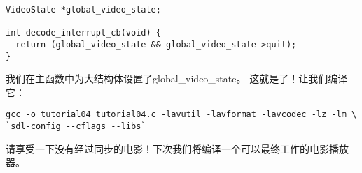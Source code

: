 \begin{lstlisting}
VideoState *global_video_state;

int decode_interrupt_cb(void) {
  return (global_video_state && global_video_state->quit);
}
\end{lstlisting}

我们在主函数中为大结构体设置了global_video_state。
这就是了！让我们编译它：
\begin{lstlisting}
gcc -o tutorial04 tutorial04.c -lavutil -lavformat -lavcodec -lz -lm \
`sdl-config --cflags --libs`
\end{lstlisting}

请享受一下没有经过同步的电影！下次我们将编译一个可以最终工作的电影播放器。
